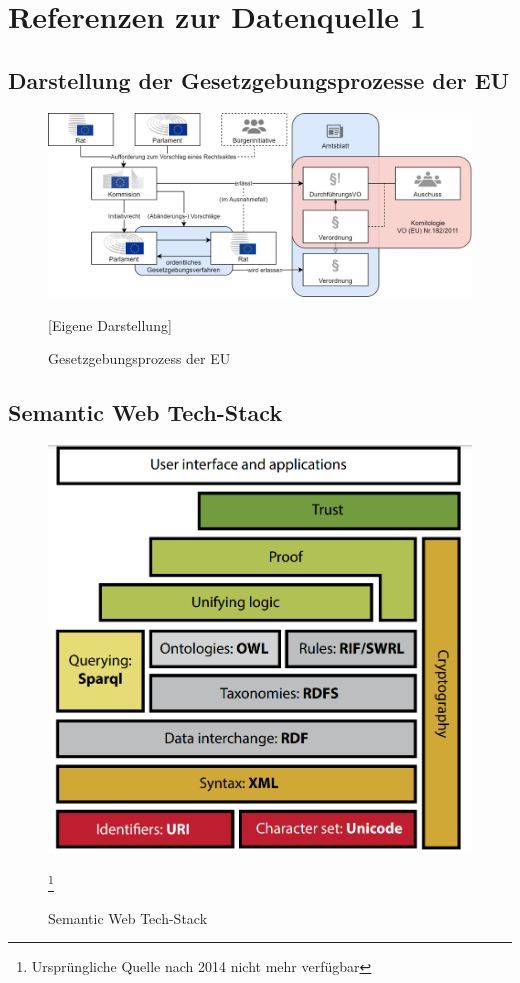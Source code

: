 
\chapter{Referenzen zur Datenquelle 1}
    
    \section{Darstellung der Gesetzgebungsprozesse der EU}
    
    \begin{figure}[H]
        \centering
        \includegraphics[width=\linewidth]{gfx/Gesegebungsprozess.png}
        \caption{Gesetzgebungsprozess der EU} 
        [Eigene Darstellung]
        \label{fig:europeg}
    \end{figure}

\section{Semantic Web Tech-Stack}
    
    \begin{figure}[H]
        \centering
        \includegraphics[width=.75\linewidth]{gfx/semantic_web_cake.png}
        \caption{Semantic Web Tech-Stack}\cite[10]{eu_cellar}\footnote{Ursprüngliche Quelle nach 2014 nicht mehr verfügbar}
        \label{fig:semantic}
    \end{figure}


